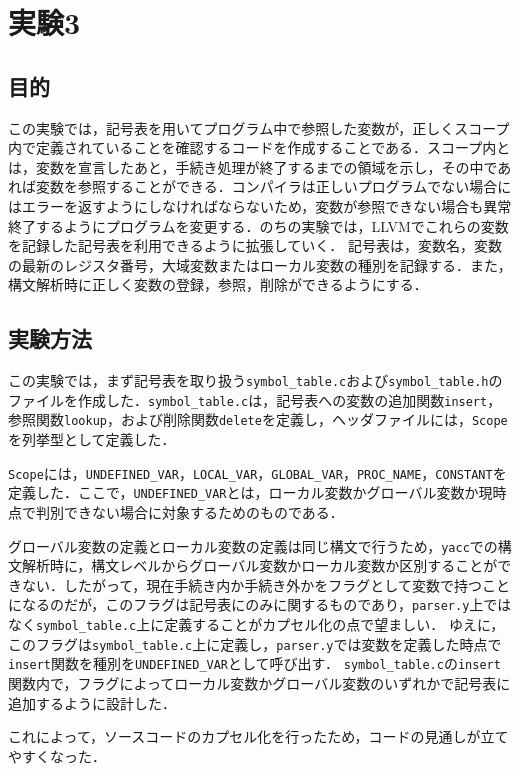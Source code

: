 \documentclass[uplatex]{jsarticle}
\begin{document}
\section{実験3}
\subsection{目的}
この実験では，記号表を用いてプログラム中で参照した変数が，正しくスコープ内で定義されていることを確認するコードを作成することである．スコープ内とは，変数を宣言したあと，手続き処理が終了するまでの領域を示し，その中であれば変数を参照することができる．コンパイラは正しいプログラムでない場合にはエラーを返すようにしなければならないため，変数が参照できない場合も異常終了するようにプログラムを変更する．のちの実験では，LLVMでこれらの変数を記録した記号表を利用できるように拡張していく．
記号表は，変数名，変数の最新のレジスタ番号，大域変数またはローカル変数の種別を記録する．また，構文解析時に正しく変数の登録，参照，削除ができるようにする．

\subsection{実験方法}
この実験では，まず記号表を取り扱う\verb#symbol_table.c#および\verb#symbol_table.h#のファイルを作成した．\verb#symbol_table.c#は，記号表への変数の追加関数\verb#insert#，参照関数\verb#lookup#，および削除関数\verb#delete#を定義し，ヘッダファイルには，\verb#Scope#を列挙型として定義した．

\verb#Scope#には，\verb#UNDEFINED_VAR#，\verb#LOCAL_VAR#，\verb#GLOBAL_VAR#，\verb#PROC_NAME#，\verb#CONSTANT#を定義した．ここで，\verb#UNDEFINED_VAR#とは，ローカル変数かグローバル変数か現時点で判別できない場合に対象するためのものである．

グローバル変数の定義とローカル変数の定義は同じ構文で行うため，\verb#yacc#での構文解析時に，構文レベルからグローバル変数かローカル変数か区別することができない．したがって，現在手続き内か手続き外かをフラグとして変数で持つことになるのだが，このフラグは記号表にのみに関するものであり，\verb#parser.y#上ではなく\verb#symbol_table.c#上に定義することがカプセル化の点で望ましい．
ゆえに，このフラグは\verb#symbol_table.c#上に定義し，\verb#parser.y#では変数を定義した時点で\verb#insert#関数を種別を\verb#UNDEFINED_VAR#として呼び出す．
\verb#symbol_table.c#の\verb#insert#関数内で，フラグによってローカル変数かグローバル変数のいずれかで記号表に追加するように設計した．

これによって，ソースコードのカプセル化を行ったため，コードの見通しが立てやすくなった．
\end{document}
